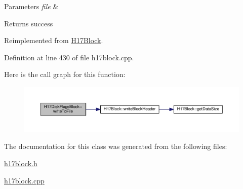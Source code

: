 \begin{DoxyParams}{Parameters}
{\em file} & \\
\hline
\end{DoxyParams}
\begin{DoxyReturn}{Returns}
success 
\end{DoxyReturn}


Reimplemented from \hyperlink{classH17Block_a59901675cd140c907fb6de4c8e0452d5}{H17\+Block}.



Definition at line 430 of file h17block.\+cpp.



Here is the call graph for this function\+:\nopagebreak
\begin{figure}[H]
\begin{center}
\leavevmode
\includegraphics[width=350pt]{classH17DiskFlagsBlock_a50319616d0931d82ddfb58c00f5909c6_cgraph}
\end{center}
\end{figure}




The documentation for this class was generated from the following files\+:\begin{DoxyCompactItemize}
\item 
\hyperlink{h17block_8h}{h17block.\+h}\item 
\hyperlink{h17block_8cpp}{h17block.\+cpp}\end{DoxyCompactItemize}
